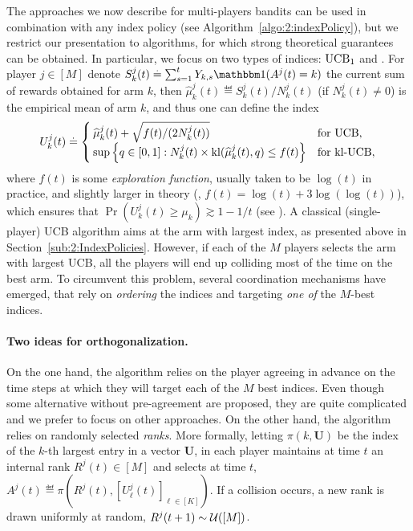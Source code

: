 The approaches we now describe for multi-players bandits can be used in combination with any index policy (see Algorithm~\ref{algo:2:indexPolicy}), but we restrict our presentation to \UCB{} algorithms, for which strong theoretical guarantees can be obtained. In particular, we focus on two types of indices:
$\mathrm{UCB}_1$ \citep{Auer02}
and \klUCB{} \citep{KLUCBJournal}.
For player $j\in[M]$
%
denote $S_k^j(t) \eqdef \sum_{s=1}^t Y_{k,s} \indic(A^j(t) = k)$ the current sum of rewards obtained for arm $k$,
then $\widehat{\mu}_k^j(t) \eqdef S_k^j(t)/N_k^j(t)$ (if $N_k^j(t)\neq 0$) is the empirical mean of arm $k$, and thus one can define the index
\begin{equation}\label{eq:5:indexFor_UCB_klUCB}
  U_k^j(t) \overset{.}{=} \begin{cases}
      \widehat{\mu}_k^j(t)  + \sqrt{  f(t) / (2N_k^j(t))}
      &\text{for } \mathrm{UCB}, \\
      \sup\left\{ q \in [0, 1]: N_k^j(t)\times \mathrm{kl}(\widehat{\mu}_k^j(t), q) \leq f(t) \right\}
      &\text{for } \mathrm{kl}\text{-}\mathrm{UCB},
  \end{cases}
\end{equation}
where $f(t)$ is some \emph{exploration function}, usually taken to be $\log(t)$ in practice, and slightly larger in theory (\eg, $f(t)=\log(t)+3\log(\log(t))$), which ensures that  $\Pr(U_k^j(t) \geq \mu_k) \gtrsim 1 - 1/t$ (see \cite{KLUCBJournal}).
A classical (single-player) UCB algorithm aims at the arm with largest index, as presented above in Section~\ref{sub:2:IndexPolicies}.
However, if each of the $M$ players selects the arm with largest UCB, all the players will end up colliding most of the time on the best arm.
To circumvent this problem, several coordination mechanisms have emerged, that rely on \emph{ordering} the indices and targeting \emph{one of} the $M$-best indices.


\paragraph{Two ideas for orthogonalization.}
\label{par:5:twoIdeasOrthogonalization}
%
On the one hand, the \TDFS{} algorithm \citep{Zhao10} relies on the player agreeing in advance on the time steps at which they will target each of the $M$ best indices.
Even though some alternative without pre-agreement are proposed, they are quite complicated and we prefer to focus on other approaches.
%
On the other hand, the \rhoRand{} algorithm \citep{Anandkumar11} relies on randomly selected \emph{ranks}. %
%
More formally, letting $\pi(k,\mathbf{U})$ be the index of the $k$-th largest entry in a vector $\mathbf{U}$,
in \rhoRand{} each player maintains at time $t$ an internal rank $R^j(t)\in[M]$
and selects at time $t$,
$A^j(t) \eqdef \pi\left(R^j(t), [U^j_\ell(t)]_{\ell\in[K]}\right)$.
If a collision occurs, a new rank is drawn uniformly at random, $R^j(t+1) \sim \mathcal{U}([M])$.


